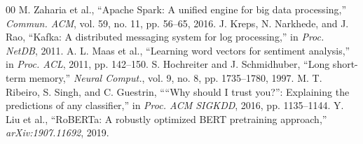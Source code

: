 \documentclass[conference]{IEEEtran}
\begin{document}
\begin{thebibliography}{00}
 M. Zaharia et al., ``Apache Spark: A unified engine for big data processing,'' \textit{Commun. ACM}, vol. 59, no. 11, pp. 56--65, 2016.
 J. Kreps, N. Narkhede, and J. Rao, ``Kafka: A distributed messaging system for log processing,'' in \textit{Proc. NetDB}, 2011.
 A. L. Maas et al., ``Learning word vectors for sentiment analysis,'' in \textit{Proc. ACL}, 2011, pp. 142--150.
 S. Hochreiter and J. Schmidhuber, ``Long short-term memory,'' \textit{Neural Comput.}, vol. 9, no. 8, pp. 1735--1780, 1997.
 M. T. Ribeiro, S. Singh, and C. Guestrin, ````Why should I trust you?'': Explaining the predictions of any classifier,'' in \textit{Proc. ACM SIGKDD}, 2016, pp. 1135--1144.
 Y. Liu et al., ``RoBERTa: A robustly optimized BERT pretraining approach,'' \textit{arXiv:1907.11692}, 2019.
\end{thebibliography}
\end{document}
